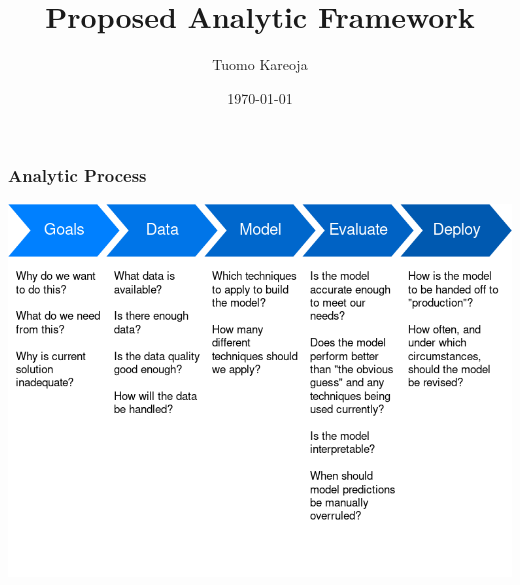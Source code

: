 \documentclass[10pt]{beamer}
\title[Credit Default Prediction]{Proposed Analytic Framework} %
\author{Tuomo Kareoja} %
\institute[Alert! Analytics] %
{
Alert! Analytics \\ %
\medskip
}
\date{\today} %
\begin{document}
\begin{frame}
\titlepage %
\end{frame}



\begin{frame}
\frametitle{Analytic Process}

\bigskip
\bigskip
{
    \centering
    \includegraphics[width=\textwidth,height=\textheight,keepaspectratio]{analysis_flow.png}
    \par
}

\end{frame}
\end{document}
